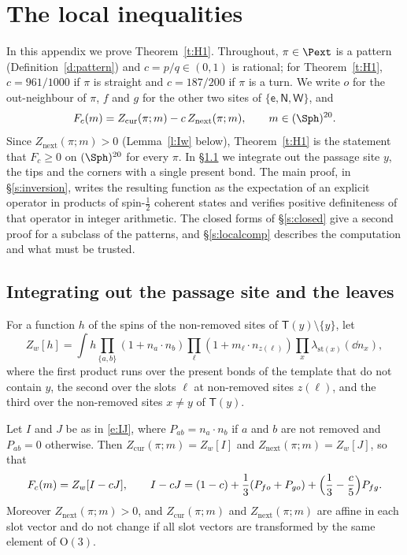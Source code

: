 \section{The local inequalities}\label{s:local}

In this appendix we prove Theorem~\ref{t:H1}. Throughout, $\pi \in \Pext$ is a pattern (Definition~\ref{d:pattern}) and $c = p/q \in (0, 1)$ is rational; for Theorem~\ref{t:H1}, $c = 961/1000$ if $\pi$ is straight and $c = 187/200$ if $\pi$ is a turn. We write $o$ for the out-neighbour of $\pi$, $f$ and $g$ for the other two sites of $\{\mathsf e, \mathsf N, \mathsf W\}$, and
\begin{equation}\label{e:Fc}
F_c(m) = Z_{\mathrm{cur}}(\pi; m) - c \, Z_{\mathrm{next}}(\pi; m), \qquad m \in (\Sph)^{20} .
\end{equation}
Since $Z_{\mathrm{next}}(\pi; m) > 0$ (Lemma~\ref{l:Iw} below), Theorem~\ref{t:H1} is the statement that $F_c \ge 0$ on $(\Sph)^{20}$ for every $\pi$. In \S\ref{s:localred} we integrate out the passage site $y$, the tips and the corners with a single present bond. The main proof, in \S\ref{s:inversion}, writes the resulting function as the expectation of an explicit operator in products of spin-$\frac12$ coherent states and verifies positive definiteness of that operator in integer arithmetic. The closed forms of \S\ref{s:closed} give a second proof for a subclass of the patterns, and \S\ref{s:localcomp} describes the computation and what must be trusted.

\subsection{Integrating out the passage site and the leaves}\label{s:localred}

For a function $h$ of the spins of the non-removed sites of $\mathsf T(y) \setminus \{y\}$, let
\begin{equation}\label{e:Zw}
Z_w[h] = \int h \prod_{\{a, b\}} (1 + n_a \cdot n_b) \prod_{\ell} (1 + m_\ell \cdot n_{z(\ell)}) \prod_{x} \lambda_{\mathrm{st}(x)}(\dd n_x),
\end{equation}
where the first product runs over the present bonds of the template that do not contain $y$, the second over the slots $\ell$ at non-removed sites $z(\ell)$, and the third over the non-removed sites $x \neq y$ of $\mathsf T(y)$.

\begin{lemma}\label{l:Iw}
Let $I$ and $J$ be as in \eqref{e:IJ}, where $P_{ab} = n_a \cdot n_b$ if $a$ and $b$ are not removed and $P_{ab} = 0$ otherwise. Then $Z_{\mathrm{cur}}(\pi; m) = Z_w[I]$ and $Z_{\mathrm{next}}(\pi; m) = Z_w[J]$, so that
\begin{equation}\label{e:IcJ}
F_c(m) = Z_w[I - cJ], \qquad I - cJ = (1 - c) + \frac13 (P_{fo} + P_{go}) + \Bigl( \frac13 - \frac c5 \Bigr) P_{fg} .
\end{equation}
Moreover $Z_{\mathrm{next}}(\pi; m) > 0$, and $Z_{\mathrm{cur}}(\pi; m)$ and $Z_{\mathrm{next}}(\pi; m)$ are affine in each slot vector and do not change if all slot vectors are transformed by the same element of $\mathrm O(3)$.
\end{lemma}

